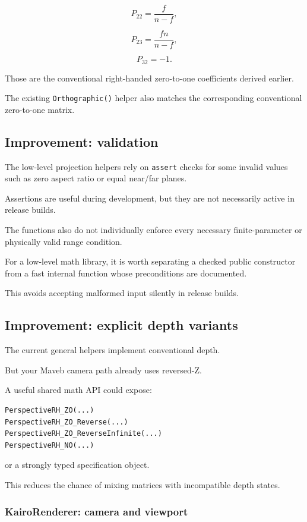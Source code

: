 \[
 P_{22}=\frac f{n-f},
\]

\[
 P_{23}=\frac{fn}{n-f},
\]

\[
 P_{32}=-1.
\]

Those are the conventional right-handed zero-to-one coefficients derived earlier.

The existing \texttt{Orthographic()} helper also matches the corresponding conventional zero-to-one matrix.

\subsection{Improvement: validation}\label{02-foundations-ii-ch037-improvement-validation}

The low-level projection helpers rely on \texttt{assert} checks for some invalid values such as zero aspect ratio or equal near/far planes.

Assertions are useful during development, but they are not necessarily active in release builds.

The functions also do not individually enforce every necessary finite-parameter or physically valid range condition.

For a low-level math library, it is worth separating a checked public constructor from a fast internal function whose preconditions are documented.

This avoids accepting malformed input silently in release builds.

\subsection{Improvement: explicit depth variants}\label{02-foundations-ii-ch037-improvement-explicit-depth-variants}

The current general helpers implement conventional depth.

But your Maveb camera path already uses reversed-Z.

A useful shared math API could expose:

\begin{verbatim}
PerspectiveRH_ZO(...)
PerspectiveRH_ZO_Reverse(...)
PerspectiveRH_ZO_ReverseInfinite(...)
PerspectiveRH_NO(...)
\end{verbatim}

or a strongly typed specification object.

This reduces the chance of mixing matrices with incompatible depth states.

\subsubsection{KairoRenderer: camera and viewport}\label{02-foundations-ii-ch037-kairorenderer-camera-and-viewport}

